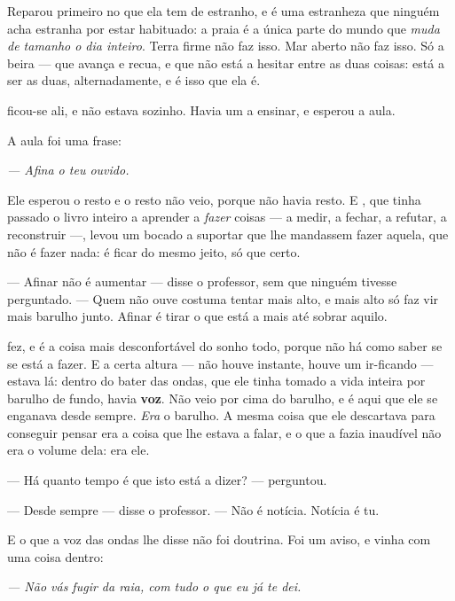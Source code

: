 \documentclass[livro.tex]{subfiles}
\begin{document}
\medskip
\noindent Reparou primeiro no que ela tem de estranho, e é uma estranheza que
ninguém acha estranha por estar habituado: a praia é a única parte do mundo que
\emph{muda de tamanho o dia inteiro}. Terra firme não faz isso. Mar aberto não
faz isso. Só a beira --- que avança e recua, e que não está a hesitar entre as
duas coisas: está a ser as duas, alternadamente, e é isso que ela é.

\medskip
\noindent \Ben ficou-se ali, e não estava sozinho. Havia um a ensinar, e
\Ben esperou a aula.

\medskip
\noindent A aula foi uma frase:

\begin{center}
\emph{--- Afina o teu ouvido.}
\end{center}

\noindent Ele esperou o resto e o resto não veio, porque não havia resto. E
\Ben , que tinha passado o livro inteiro a aprender a \emph{fazer} coisas ---
a medir, a fechar, a refutar, a reconstruir ---, levou um bocado a suportar que
lhe mandassem fazer aquela, que não é fazer nada: é ficar do mesmo jeito, só que
certo.

\medskip
\noindent --- Afinar não é aumentar --- disse o professor, sem que ninguém
tivesse perguntado. --- Quem não ouve costuma tentar mais alto, e mais alto só
faz vir mais barulho junto. Afinar é tirar o que está a mais até sobrar aquilo.

\medskip
\noindent \Ben fez, e é a coisa mais desconfortável do sonho todo, porque não
há como saber se se está a fazer. E a certa altura --- não houve instante,
houve um ir-ficando --- estava lá: dentro do bater das ondas, que ele tinha
tomado a vida inteira por barulho de fundo, havia \textbf{voz}. Não veio por
cima do barulho, e é aqui que ele se enganava desde sempre. \emph{Era} o
barulho. A mesma coisa que ele descartava para conseguir pensar era a coisa que
lhe estava a falar, e o que a fazia inaudível não era o volume dela: era ele.

\medskip
\noindent --- Há quanto tempo é que isto está a dizer? --- perguntou.

--- Desde sempre --- disse o professor. --- Não é notícia. Notícia é tu.

\medskip
\noindent E o que a voz das ondas lhe disse não foi doutrina. Foi um aviso, e
vinha com uma coisa dentro:

\begin{center}
\emph{--- Não vás fugir da raia, com tudo o que eu já te dei.}
\end{center}
\end{document}
